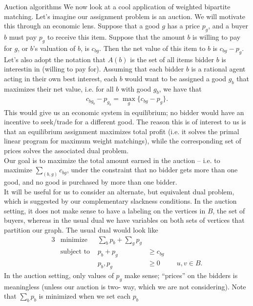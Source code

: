 \begin{section}{Auction algorithms}
	We now look at a cool application of weighted bipartite matching. Let's imagine our assignment 
	problem is an auction. We will motivate this through an economic lens. Suppose that a good $g$ 
	has a price $p_g$, and a buyer $b$ must pay $p_g$ to receive this item. Suppose that the 
	amount $b$ is willing to pay for $g$, or $b$'s valuation of $b$, is $c_{bg}$. Then the net value 
	of this item to $b$ is $c_{bg} - p_g$. Let's also adopt the notation that $A(b)$ is the set of 
	all items bidder $b$ is interestin in (willing to pay for). 
	Assuming that each bidder $b$ is a rational agent acting 
	in their own best interest, each $b$ would want to be assigned a good $g_b$ that maximizes their 
	net value, i.e. for all $b$ with good $g_b$, we have that 
	\begin{align}
		c_{bg_b} - p_{g_b} = \max_g \{c_{bg} - p_g \}.
	\end{align}
	This would give us an economic system in equilibrium; no bidder would have an incentive to 
	seek/trade for a different good.  
	The reason this is of interest to us is that an equilibrium assignment maximizes total 
	profit (i.e. it solves the primal linear program for maximum weight matchings), while the 
	corresponding set of prices solves the associated dual problem.\\
	Our goal is to maximize the total amount earned in the auction -- i.e. to 
	maximize $\sum_{(b,g)} c_{bg}$, under the constraint that no bidder gets more than one good, 
	and no good is purchased by more than one bidder. \\
	It will be useful for us to consider an alternate, but equivalent dual problem, which is 
	suggested by our complementary slackness conditions. In the auction setting, it does not make 
	sense to have a labeling on the vertices in $B$, the set of buyers, whereas in the usual dual we 
	have variables on both sets of vertices that partition our graph. The usual dual would look 
	like
	\begin{alignat}{3}
		& \text{minimize } & \sum_{b} p_b + \sum_{g} p_g & \\
		& \text{subject to } & p_b + p_g & \geq c_{bg} \\
				     && p_b,p_g & \geq 0 & \quad u,v\in B.
	\end{alignat}
	In the auction setting, only 
	values of $p_g$ make sense; ``prices'' on the bidders is meaningless (unless our auction is two-
	way, which we are not considering). Note that $\sum_b p_b$ is minimized when we set each $p_b$ 

\end{section}
